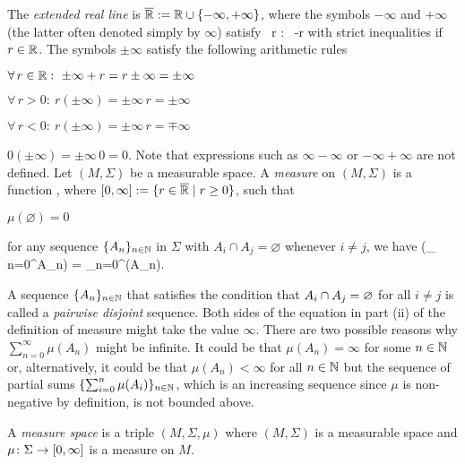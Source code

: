 \bd
The \emph{extended real line} is $\overline{\mathbb{R}} := \mathbb{R} \cup \{-\infty,+\infty\}$, where the symbols $-\infty$ and $+\infty$ (the latter often denoted simply by $\infty$) satisfy
\bse
\forall \, r \in \overline{\R} : \ -\infty\leq r \leq \infty
\ese
with strict inequalities if $r\in\mathbb{R}$.
The symbols $\pm\infty$ satisfy the following arithmetic rules
\ben[label=(\roman*)]
\item $\forall \, r\in \mathbb{R} : \ \pm \infty + r = r \pm \infty = \pm \infty$
\item $\forall \, r > 0 : \ r(\pm\infty)=\pm \infty\, r = \pm \infty$
\item $\forall \, r < 0 : \ r(\pm\infty)=\pm \infty\, r = \mp \infty$
\item $0(\pm\infty)=\pm \infty\, 0 = 0$.
\een
Note that expressions such as $\infty-\infty$ or $-\infty+\infty$ are not defined.
\ed
\bd
Let $(M,\Sigma)$ be a measurable space. A \emph{measure} on $(M,\Sigma)$ is a function
\bse
\mu\cl\Sigma\to[0,\infty],
\ese
where $[0,\infty]:=\{r\in\overline{\mathbb{R}}\mid r \geq 0\}$, such that
\ben[label=(\roman*)]
\item $\mu(\varnothing)=0$
\item for any sequence $\{A_n\}_{n\in \mathbb{N}}$ in $\Sigma$ with $A_i\cap A_j = \varnothing$ whenever $i\neq j$, we have
\bse
\mu\biggl(\bigcup_{\,n=0}^{\infty}A_n\biggr) = \sum_{n=0}^{\infty}\mu(A_n).
\ese
\een
\ed

A sequence $\{A_n\}_{n\in \mathbb{N}}$ that satisfies the condition that $A_i \cap A_j = \varnothing$ for all $i \neq j$ is called a \emph{pairwise disjoint} sequence.
\br
Both sides of the equation in part (ii) of the definition of measure might take the value $\infty$. There are two possible reasons why $\sum_{n=0}^{\infty}\mu(A_n)$ might be infinite. It could be that $\mu(A_n) = \infty$ for some $n\in \mathbb{N}$ or, alternatively, it could be that $\mu(A_n) < \infty$ for all $n \in \mathbb{N}$ but the sequence of partial sums $\{ \sum_{i=0}^{n}\mu(A_i)\}_{n\in\mathbb{N}}$, which is an increasing sequence since $\mu$ is non-negative by definition, is not bounded above.
\er

\bd
A \emph{measure space} is a triple $(M,\Sigma,\mu)$ where $(M,\Sigma)$ is a measurable space and $\mu\colon\Sigma\to[0,\infty]$ is a measure on $M$.
\ed


